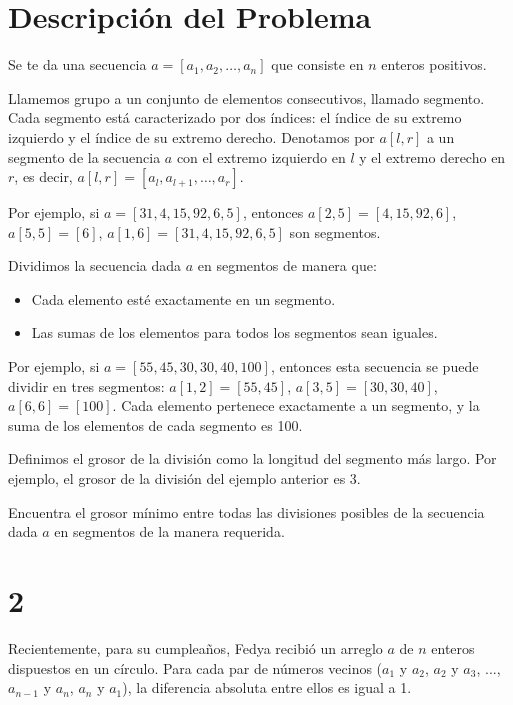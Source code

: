 \documentclass{article}
\begin{document}
\section*{Descripción del Problema}

Se te da una secuencia $a = [a_1, a_2, \ldots, a_n]$ que consiste en $n$ enteros positivos.

Llamemos grupo a un conjunto de elementos consecutivos, llamado segmento. Cada segmento está caracterizado por dos índices: el índice de su extremo izquierdo y el índice de su extremo derecho. Denotamos por $a[l, r]$ a un segmento de la secuencia $a$ con el extremo izquierdo en $l$ y el extremo derecho en $r$, es decir, $a[l, r] = [a_l, a_{l+1}, \ldots, a_r]$.

Por ejemplo, si $a = [31, 4, 15, 92, 6, 5]$, entonces $a[2, 5] = [4, 15, 92, 6]$, $a[5, 5] = [6]$, $a[1, 6] = [31, 4, 15, 92, 6, 5]$ son segmentos.

Dividimos la secuencia dada $a$ en segmentos de manera que:

\begin{itemize}
    \item Cada elemento esté exactamente en un segmento.
    \item Las sumas de los elementos para todos los segmentos sean iguales.
\end{itemize}

Por ejemplo, si $a = [55, 45, 30, 30, 40, 100]$, entonces esta secuencia se puede dividir en tres segmentos: $a[1,2] = [55, 45]$, $a[3,5] = [30, 30, 40]$, $a[6,6] = [100]$. Cada elemento pertenece exactamente a un segmento, y la suma de los elementos de cada segmento es 100.

Definimos el grosor de la división como la longitud del segmento más largo. Por ejemplo, el grosor de la división del ejemplo anterior es 3.

Encuentra el grosor mínimo entre todas las divisiones posibles de la secuencia dada $a$ en segmentos de la manera requerida.

\section{2}

Recientemente, para su cumpleaños, Fedya recibió un arreglo $a$ de $n$ enteros dispuestos en un círculo. Para cada par de números vecinos ($a_1$ y $a_2$, $a_2$ y $a_3$, ..., $a_{n-1}$ y $a_n$, $a_n$ y $a_1$), la diferencia absoluta entre ellos es igual a 1.
\end{document}
